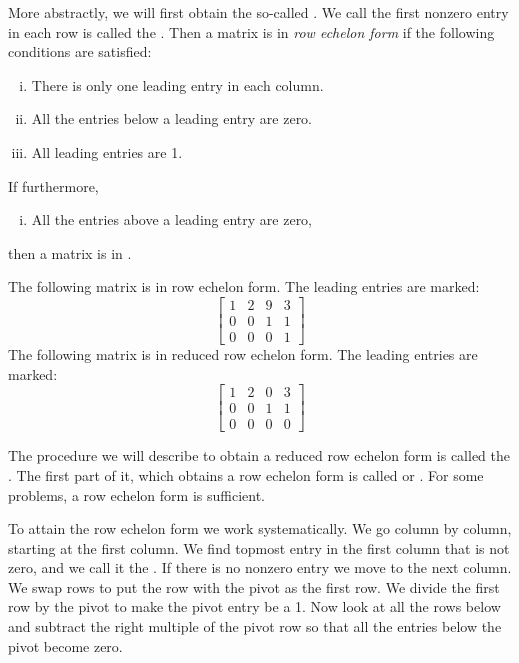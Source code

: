 More abstractly, we will first obtain the so-called
\emph{}.
We call the first nonzero entry in each row is called the
\emph{}.  Then
a matrix is in \emph{row echelon form} if
the following conditions are satisfied:
\begin{enumerate}[(i)]
\item There is only one leading entry in each column.
\item All the entries below a leading entry are zero.
\item All leading entries are 1.
\end{enumerate}
If furthermore,
\begin{enumerate}[(i),resume]
\item All the entries above a leading entry are zero,
\end{enumerate}
then a matrix is in \emph{}.

\begin{example}
The following matrix is in row echelon form.  The leading
entries are marked:
\begin{equation*}
\begin{bmatrix}
\boxed{1} & 2 & 9 & 3 \\
0 & 0 & \boxed{1} & 1 \\
0 & 0 & 0 & \boxed{1}
\end{bmatrix}
\end{equation*}
The following matrix is in reduced row echelon form.  The leading
entries are marked:
\begin{equation*}
\begin{bmatrix}
\boxed{1} & 2 & 0 & 3 \\
0 & 0 & \boxed{1} & 1 \\
0 & 0 & 0 & 0
\end{bmatrix}
\end{equation*}
\end{example}

The procedure we will describe to obtain a reduced row echelon form
is called the \emph{}.
The first part of it, which obtains a row echelon form is called 
\emph{} or
\emph{}.  For some problems, a row echelon
form is sufficient.

To attain the row echelon form we work systematically.
We go column by column, starting at the first column.  We find topmost
entry in the first column that is not zero, and we call it the
\emph{}.  If there is no nonzero entry
we move to the next column.  We swap rows to put the row with
the pivot as the first row.  We divide the first row
by the pivot to make the pivot entry be a 1.  Now look at all the rows below
and subtract the right multiple of the pivot row so that all the entries
below the pivot become zero.

